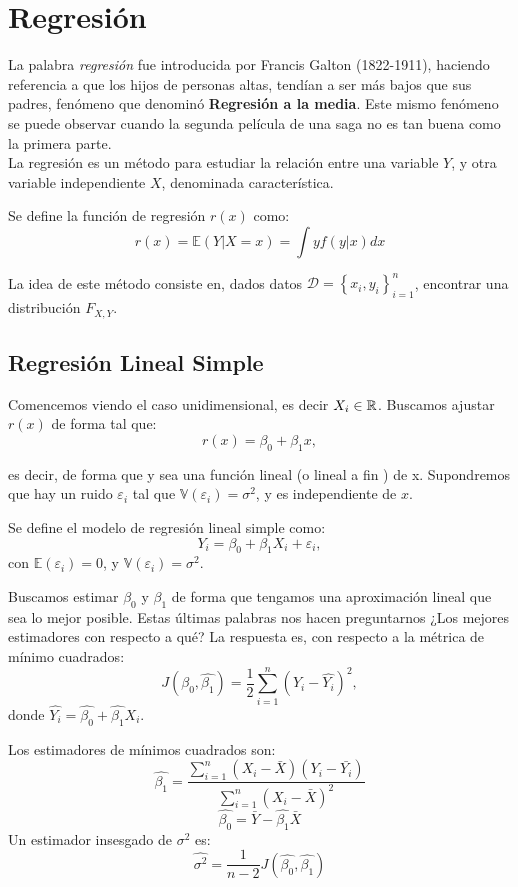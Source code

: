 \section{Regresión}

La palabra \emph{regresión} fue introducida por Francis Galton (1822-1911), haciendo referencia a que los hijos de personas altas, tendían a ser más bajos que sus padres,  fenómeno que denominó \textbf{Regresión a la media}. Este mismo fenómeno se puede observar cuando la segunda película de una saga no es tan buena como la primera parte. \\
La regresión es un método para estudiar la relación entre una variable $Y$, y otra variable independiente $X$, denominada característica. 
\begin{definition} Se define la función de regresión $r(x)$ como:
$$
r(x)=\mathbb{E}(Y|X=x)=\int yf(y|x)dx
$$

\end{definition}
La idea de este método consiste en, dados datos $\mathcal{D}=\left \{ x_i,y_i \right \}_{i=1}^{n}$, encontrar una distribución $F_{X,Y}$. 


\subsection{Regresión Lineal Simple}

Comencemos viendo el caso unidimensional, es decir $X_i \in {\mathbb R}$. Buscamos ajustar $r(x)$ de forma tal que: 
$$
r(x)=\beta_0 + \beta_1 x,
$$

 es decir, de forma que y sea una función lineal (o lineal a fin ) de x. 
Supondremos que hay un ruido $\varepsilon_i$ tal que $\mathbb{V}(\varepsilon_i)=\sigma^2$, y es independiente de $x$. \\
\begin{definition}
Se define el modelo de regresión lineal simple como: 
$$
Y_i=\beta_0+\beta_1 X_i+ \varepsilon_i,
$$
con $\mathbb{E}(\varepsilon_i)=0$, y $\mathbb{V}(\varepsilon_i)=\sigma^2$.
\end{definition}
Buscamos estimar $\beta_0$ y $\beta_1$ de forma que tengamos una aproximación lineal que sea lo mejor posible. Estas últimas palabras nos hacen preguntarnos ¿Los mejores estimadores con respecto a qué? La respuesta es, con respecto a la métrica de mínimo cuadrados: 
$$
J(\hat{\beta_0},\hat{\beta_1})=\dfrac{1}{2} \sum_{i=1}^{n}(Y_i-\hat{Y_i})^{2},
$$
donde $\hat{Y_i}=\hat{\beta_0}+\hat{\beta_1}X_i$. 
\begin{theorem}
Los estimadores de mínimos cuadrados son: 
$$
\hat{\beta_1}=\dfrac{\sum_{i=1}^{n}(X_i-\bar{X})(Y_i-\bar{Y_i})}{\sum_{i=1}^{n}(X_i-\bar{X})^{2}}
$$
$$
\hat{\beta_0}=\bar{Y}-\hat{\beta_1}\bar{X}
$$
Un estimador insesgado de $\sigma^2$ es:
$$
\hat{\sigma^2}=\dfrac{1}{n-2} J(\hat{\beta_0},\hat{\beta_1})
$$
\end{theorem}

